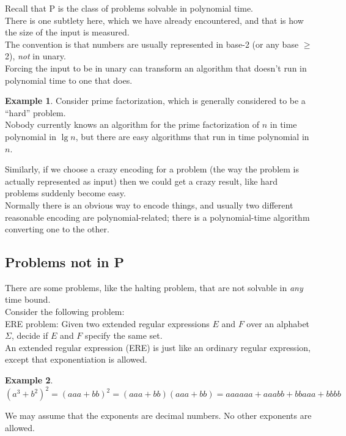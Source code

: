 \documentclass[12pt]{article}
\theoremstyle{plain}
\theoremstyle{definition}
\newtheorem*{ex*}{Example}
\begin{document}
Recall that P is the class of problems solvable in polynomial time. \\
There is one subtlety here, which we have already encountered, and that is how the size of the input is measured. \\
The convention is that numbers are usually represented in base-2 (or any base $\geq$ 2), \emph{not} in unary. \\
Forcing the input to be in unary can transform an algorithm that doesn't run in polynomial time to one that does.
\begin{ex*}
Consider prime factorization, which is generally considered to be a ``hard'' problem. \\
Nobody currently knows an algorithm for the prime factorization of $n$ in time polynomial in $\lg{n}$, but there are easy algorithms that run in time polynomial in $n$.
\end{ex*}

Similarly, if we choose a crazy encoding for a problem (the way the problem is actually represented as input) then we could get a crazy result, like hard problems suddenly become easy. \\
Normally there is an obvious way to encode things, and usually two different reasonable encoding are polynomial-related;
there is a polynomial-time algorithm converting one to the other.

\subsection{Problems not in P}
There are some problems, like the halting problem, that are not solvable in \emph{any} time bound. \\

Consider the following problem: \\
ERE problem: Given two extended regular expressions $E$ and $F$ over an alphabet $\Sigma$, decide if $E$ and $F$ specify the same set. \\

An extended regular expression (ERE) is just like an ordinary regular expression, except that exponentiation is allowed.
\begin{ex*}
$(a^{3} + b^{2})^{2} = (aaa + bb)^{2} = (aaa + bb)(aaa + bb) = aaaaaa + aaabb + bbaaa + bbbb$
\end{ex*}

We may assume that the exponents are decimal numbers.
No other exponents are allowed. \\
\end{document}
